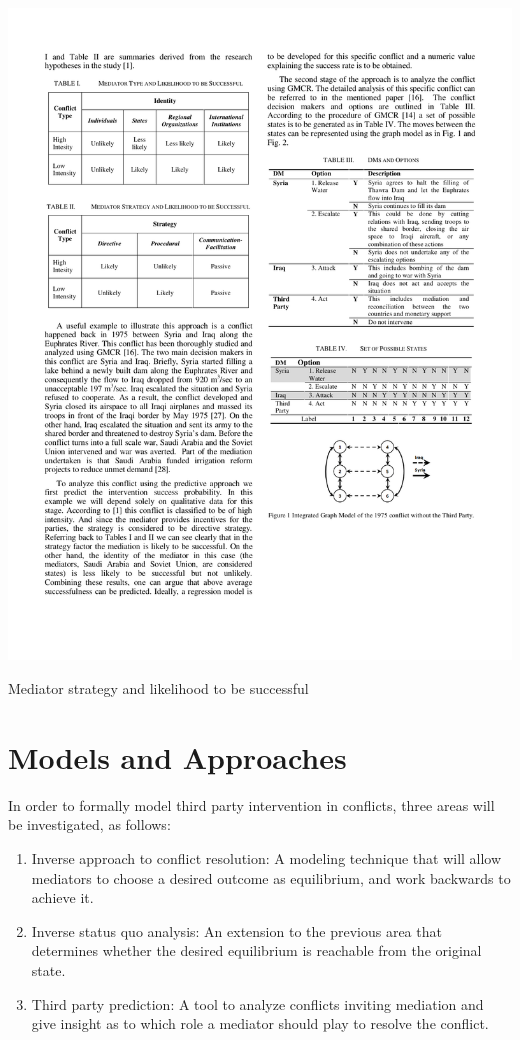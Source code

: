 \documentclass[letterpaper,12pt,titlepage,oneside,final]{book}
\begin{document}
\begin{center}

\begin{table}[H]
\centering
\includegraphics[scale=1]{PDF-IMG/MEDIATOR_STR.pdf}

\caption{Mediator strategy and likelihood to be successful}

\label{tbl:MEDIATOR_STR}
\end{table}
\end{center}

\section{Models and Approaches}

In order to formally model third party intervention in conflicts, three areas will be investigated, as follows:
\begin{enumerate}
\item Inverse approach to conflict resolution: A modeling technique that will allow mediators to choose a desired outcome as equilibrium, and work backwards to achieve it.
\item Inverse status quo analysis: An extension to the previous area that determines whether the desired equilibrium is reachable from the original state.
\item Third party prediction: A tool to analyze conflicts inviting mediation and give insight as to which role a mediator should play to resolve the conflict.

\end{enumerate}
\end{document}
